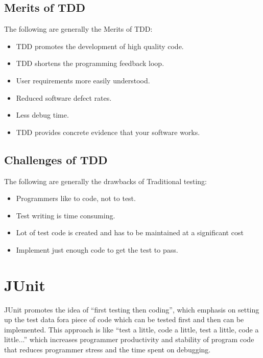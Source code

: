 \documentclass[11pt,a4paper]{article}
\begin{document}
\subsection*{Merits of TDD}
The following are generally the Merits of TDD:
\begin{itemize}
\item TDD promotes the development of high quality code.
\item TDD shortens the programming feedback loop.
\item User requirements more easily understood.
\item Reduced software defect rates.
\item Less debug time.
\item TDD provides concrete evidence that your software works.
\end{itemize}

\subsection*{Challenges of TDD}
The following are generally the drawbacks of Traditional testing:
\begin{itemize}
\item Programmers like to code, not to test.
\item Test writing is time consuming.
\item Lot of test code is created and has to be maintained at a significant cost
\item Implement just enough code to get the test to pass.
\end{itemize}

\section*{JUnit}
JUnit promotes the idea of ``first testing then coding'', which emphasis on setting up the test data fora piece of code which can be tested first and then can be implemented. This approach is like ``test a little, code a little, test a little, code a little...'' which increases programmer productivity and stability
of program code that reduces programmer stress and the time spent on debugging.
\end{document}
